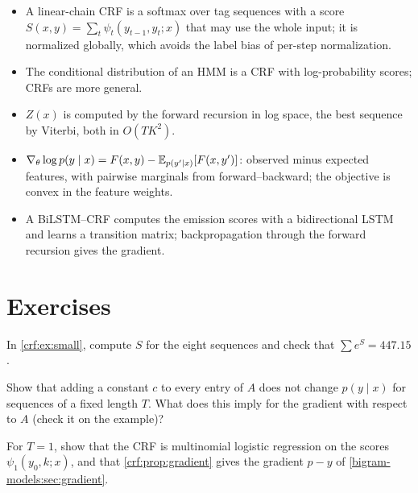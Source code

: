 \begin{notechapter}
\begin{chaptersummary}
\begin{itemize}
  \item A linear-chain CRF is a softmax over tag sequences with a score $S(x, y) = \sum_t\psi_t(y_{t-1}, y_t; x)$ that may use the whole
        input; it is normalized globally, which avoids the label bias of per-step normalization.
  \item The conditional distribution of an HMM is a CRF with log-probability scores; CRFs are more
        general.
  \item $Z(x)$ is computed by the forward recursion in log space, the best sequence by Viterbi, both in
        $O(TK^2)$.
  \item $\nabla_\theta\log p(y\mid x) = F(x, y) - \mathbb{E}_{p(y'\mid x)}[F(x, y')]$: observed minus expected features, with pairwise marginals from
        forward--backward; the objective is convex in the feature weights.
  \item A BiLSTM--CRF computes the emission scores with a bidirectional LSTM and learns a transition
        matrix; backpropagation through the forward recursion gives the gradient.
\end{itemize}
\end{chaptersummary}

\section*{Exercises}

\begin{exercise}\label{crf:exr:1}
In \cref{crf:ex:small}, compute $S$ for the eight sequences and check that $\sum e^S = 447.15$.
\end{exercise}

\begin{exercise}\label{crf:exr:2}
Show that adding a constant $c$ to every entry of $A$ does not change $p(y\mid x)$ for sequences of a fixed length $T$. What
does this imply for the gradient with respect to $A$ (check it on the example)?
\end{exercise}

\begin{exercise}\label{crf:exr:3}
For $T = 1$, show that the CRF is multinomial logistic regression on the scores $\psi_1(y_0, k; x)$, and that
\cref{crf:prop:gradient} gives the gradient $p - y$ of \cref{bigram-models:sec:gradient}.
\end{exercise}


\end{notechapter}

